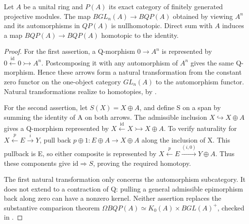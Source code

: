 \begin{proposition}\ours\quad
Let \(A\) be a unital ring and \(P(A)\) its exact category of finitely generated
projective modules. The map \(BGL_n(A)\to BQP(A)\) obtained by viewing
\(A^n\) and its automorphisms in \(QP(A)\) is nullhomotopic. Direct sum with
\(A\) induces a map \(BQP(A)\to BQP(A)\) homotopic to the identity.
\end{proposition}
\begin{proof}
For the first assertion, a Q-morphism \(0\to A^n\) is represented by
\(0\xleftarrow{\mathrm{id}}0\rightarrowtail A^n\). Postcomposing it with any
automorphism of \(A^n\) gives the same Q-morphism. Hence these arrows form a
natural transformation from the constant zero functor on the one-object
category \(GL_n(A)\) to the automorphism functor. Natural transformations realize
to homotopies, by \citet[\S1, Proposition~2]{quillen1973higher}.

For the second assertion, let \(S(X)=X\oplus A\), and define S on a span by
summing the identity of A on both arrows. The admissible inclusion
\(X\hookrightarrow X\oplus A\) gives a Q-morphism represented by
\(X\xleftarrow{\mathrm{id}}X\rightarrowtail X\oplus A\). To verify naturality
for \(X\xleftarrow{p}E\xrightarrow{i}Y\), pull back
\(p\oplus1:E\oplus A\to X\oplus A\) along the inclusion of X. This pullback
is E, so either composite is represented by
\(X\xleftarrow{p}E\xrightarrow{(i,0)}Y\oplus A\). Thus these components give
\(\mathrm{id}\Rightarrow S\), proving the required homotopy.

The first natural transformation only concerns the automorphism subcategory.
It does not extend to a contraction of Q: pulling a general admissible
epimorphism back along zero can have a nonzero kernel. Neither assertion replaces
the substantive comparison theorem
\(\Omega BQP(A)\simeq K_0(A)\times BGL(A)^+\), checked in
\citet[Corollary~IV.7.2]{weibel2013kbook}.
\end{proof}
